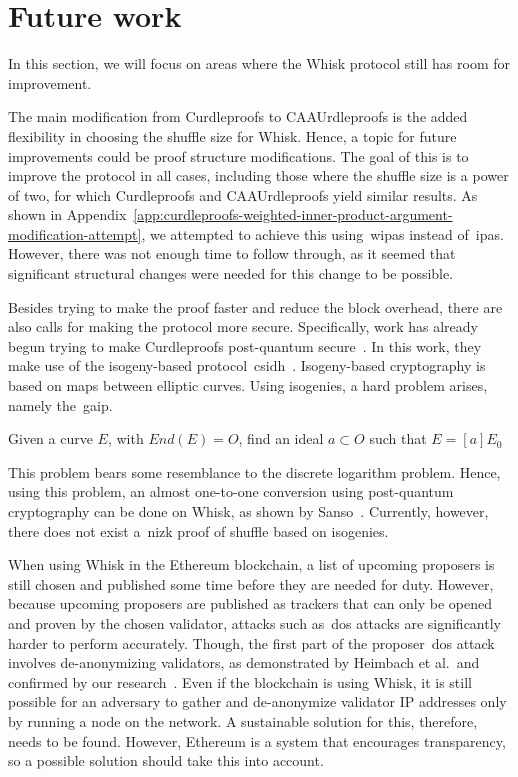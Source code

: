 \section{Future work}\label{sec:future-works}
In this section, we will focus on areas where the Whisk protocol still has room for improvement.

The main modification from Curdleproofs to CAAUrdleproofs is the added flexibility in choosing the shuffle size for Whisk.
Hence, a topic for future improvements could be proof structure modifications.
The goal of this is to improve the protocol in all cases, including those where the shuffle size is a power of two, for which Curdleproofs and CAAUrdleproofs yield similar results.
As shown in Appendix~\ref{app:curdleproofs-weighted-inner-product-argument-modification-attempt}, we attempted to achieve this using~\glspl{wipa} instead of~\glspl{ipa}.
However, there was not enough time to follow through, as it seemed that significant structural changes were needed for this change to be possible.


Besides trying to make the proof faster and reduce the block overhead, there are also calls for making the protocol more secure.
Specifically, work has already begun trying to make Curdleproofs post-quantum secure~\cite{pqwhisk}.
In this work, they make use of the isogeny-based protocol~\gls{csidh}~\cite{10.1007/978-3-030-03332-3_15}.
Isogeny-based cryptography is based on maps between elliptic curves.
Using isogenies, a hard problem arises, namely the~\gls{gaip}.
\begin{definition}
    Given a curve $E$, with $End(E)=O$, find an ideal $a\subset O$ such that $E=[a]E_0$
\end{definition}
This problem bears some resemblance to the discrete logarithm problem.
Hence, using this problem, an almost one-to-one conversion using post-quantum cryptography can be done on Whisk, as shown by Sanso~\cite{pqwhisk}.
Currently, however, there does not exist a~\gls{nizk} proof of shuffle based on isogenies.


When using Whisk in the Ethereum blockchain, a list of upcoming proposers is still chosen and published some time before they are needed for duty.
However, because upcoming proposers are published as trackers that can only be opened and proven by the chosen validator, attacks such as~\gls{dos} attacks are significantly harder to perform accurately.
Though, the first part of the proposer~\gls{dos} attack involves de-anonymizing validators, as demonstrated by Heimbach et al.~and confirmed by our research~\cite{heimbach2024deanonymizingethereumvalidatorsp2p,ouroldpaper}.
Even if the blockchain is using Whisk, it is still possible for an adversary to gather and de-anonymize validator IP addresses only by running a node on the network.
A sustainable solution for this, therefore, needs to be found.
However, Ethereum is a system that encourages transparency, so a possible solution should take this into account.
